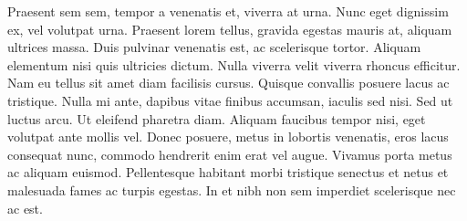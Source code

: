 Praesent sem sem, tempor a venenatis et, viverra at urna. Nunc eget dignissim ex, vel volutpat urna. Praesent lorem tellus, gravida egestas mauris at, aliquam ultrices massa. Duis pulvinar venenatis est, ac scelerisque tortor. Aliquam elementum nisi quis ultricies dictum. Nulla viverra velit viverra rhoncus efficitur. Nam eu tellus sit amet diam facilisis cursus. Quisque convallis posuere lacus ac tristique. Nulla mi ante, dapibus vitae finibus accumsan, iaculis sed nisi. Sed ut luctus arcu. Ut eleifend pharetra diam. Aliquam faucibus tempor nisi, eget volutpat ante mollis vel. Donec posuere, metus in lobortis venenatis, eros lacus consequat nunc, commodo hendrerit enim erat vel augue. Vivamus porta metus ac aliquam euismod. Pellentesque habitant morbi tristique senectus et netus et malesuada fames ac turpis egestas. In et nibh non sem imperdiet scelerisque nec ac est.